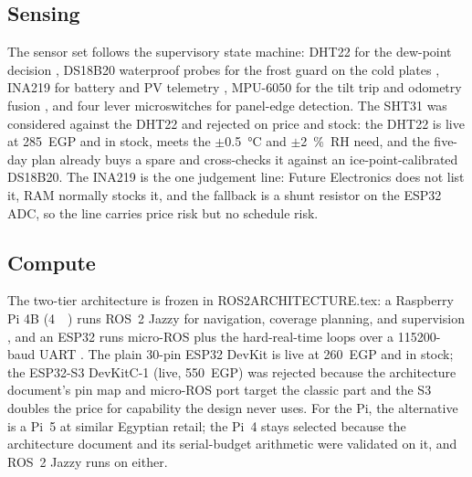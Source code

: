 \documentclass[11pt,a4paper]{article}
\newcommand{\fname}[1]{{\ttfamily\def\_{\textunderscore\allowbreak}#1}}
\begin{document}
\subsection{Sensing}
The sensor set follows the supervisory state machine: DHT22 for the dew-point
decision \cite{dht22ds}, DS18B20 waterproof probes for the frost guard on the
cold plates \cite{ds18b20ds}, INA219 for battery and PV telemetry
\cite{ina219ds}, MPU-6050 for the tilt trip and odometry fusion
\cite{mpu6050ds}, and four lever microswitches for panel-edge detection. The
SHT31 was considered against the DHT22 and rejected on price and stock: the
DHT22 is live at \num{285}~EGP and in stock, meets the $\pm$\SI{0.5}{\celsius}
and $\pm$\SI{2}{\percent}~RH need, and the five-day plan already buys a spare
and cross-checks it against an ice-point-calibrated DS18B20. The INA219 is
the one judgement line: Future Electronics does not list it, RAM normally
stocks it, and the fallback is a shunt resistor on the ESP32 ADC, so the line
carries price risk but no schedule risk.

\subsection{Compute}
The two-tier architecture is frozen in \fname{ROS2\_ARCHITECTURE.tex}: a
Raspberry Pi 4B (\SI{4}{\giga\byte}) runs ROS~2 Jazzy for navigation,
coverage planning, and supervision \cite{rpi2021brief}, and an ESP32 runs
micro-ROS plus the hard-real-time loops over a \num{115200}-baud UART
\cite{esp32ds,belsare2023microros}. The plain 30-pin ESP32 DevKit is live at
\num{260}~EGP and in stock; the ESP32-S3 DevKitC-1 (live, \num{550}~EGP) was
rejected because the architecture document's pin map and micro-ROS port
target the classic part and the S3 doubles the price for capability the
design never uses. For the Pi, the alternative is a Pi~5 at similar Egyptian
retail; the Pi~4 stays selected because the architecture document and its
serial-budget arithmetic were validated on it, and ROS~2 Jazzy runs on
either.
\end{document}
